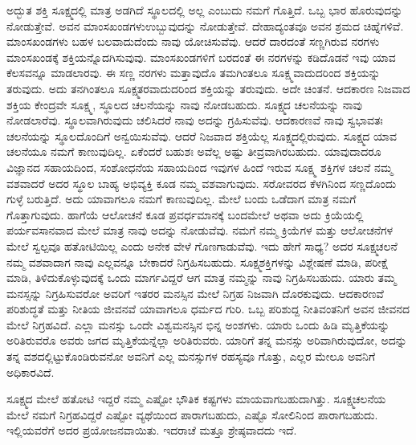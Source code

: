 ಅದ್ಭುತ ಶಕ್ತಿ ಸೂಕ್ಷ್ಮದಲ್ಲಿ ಮಾತ್ರ ಅಡಗಿದೆ ಸ್ಥೂಲದಲ್ಲಿ ಅಲ್ಲ ಎಂಬುದು ನಮಗೆ ಗೊತ್ತಿದೆ. ಒಬ್ಬ ಭಾರ ಹೊರುವುದನ್ನು ನೋಡುತ್ತೇವೆ. ಅವನ ಮಾಂಸಖಂಡಗಳು\break ಉಬ್ಬುವುದನ್ನು ನೋಡುತ್ತೇವೆ. ದೇಹಾದ್ಯಂತವೂ ಅವನ ಶ್ರಮದ ಚಿಹ್ನೆಗಳಿವೆ. ಮಾಂಸಖಂಡಗಳು ಬಹಳ ಬಲವಾದುದೆಂದು ನಾವು ಯೋಚಿಸುವೆವು. ಆದರೆ ದಾರದಂತೆ ಸಣ್ಣಗಿರುವ ನರಗಳು ಮಾಂಸಖಂಡಕ್ಕೆ ಶಕ್ತಿಯನ್ನೊದಗಿಸುವುವು. ಮಾಂಸಖಂಡಗಳಿಗೆ ಬರದಂತೆ ಈ ನರಗಳನ್ನು ಕಡಿದೊಡನೆ ಇವು ಯಾವ ಕೆಲಸವನ್ನೂ ಮಾಡಲಾರವು. ಈ ಸಣ್ಣ ನರಗಳು ಮತ್ತಾವುದೊ ತಮಗಿಂತಲೂ ಸೂಕ್ಷ್ಮವಾದುದರಿಂದ ಶಕ್ತಿಯನ್ನು ತರುವುದು. ಅದು ತನಗಿಂತಲೂ ಸೂಕ್ಷ್ಮತರವಾದುದರಿಂದ ಶಕ್ತಿಯನ್ನು ತರುವುದು. ಅದೇ ಚಿಂತನೆ. ಆದಕಾರಣ ನಿಜವಾದ ಶಕ್ತಿಯ ಕೇಂದ್ರವೇ ಸೂಕ್ಷ್ಮ, ಸ್ಥೂಲದ ಚಲನೆಯನ್ನು ನಾವು ನೋಡಬಹುದು. ಸೂಕ್ಷ್ಮದ ಚಲನೆಯನ್ನು ನಾವು ನೋಡಲಾರೆವು. ಸ್ಥೂಲವಾಗಿರುವುದು ಚಲಿಸಿದರೆ ನಾವು ಅದನ್ನು ಗ್ರಹಿಸುವೆವು. ಆದಕಾರಣವೆ ನಾವು ಸ್ವಭಾವತಃ ಚಲನೆಯನ್ನು ಸ್ಥೂಲದೊಂದಿಗೆ ಅನ್ವಯಿಸುವೆವು. ಆದರೆ ನಿಜವಾದ ಶಕ್ತಿಯೆಲ್ಲ ಸೂಕ್ಷ್ಮದಲ್ಲಿರುವುದು. ಸೂಕ್ಷ್ಮದ ಯಾವ ಚಲನೆಯೂ ನಮಗೆ ಕಾಣುವುದಿಲ್ಲ. ಏಕೆಂದರೆ ಬಹುಶಃ ಅವೆಲ್ಲ ಅಷ್ಟು ತೀವ್ರವಾಗಿರಬಹುದು. ಯಾವುದಾದರೂ ವಿಜ್ಞಾನದ ಸಹಾಯದಿಂದ, ಸಂಶೋಧನೆಯ ಸಹಾಯದಿಂದ ಇವುಗಳ ಹಿಂದೆ ಇರುವ ಸೂಕ್ಷ್ಮ ಶಕ್ತಿಗಳ ಚಲನೆ ನಮ್ಮ ವಶವಾದರೆ ಅದರ ಸ್ಥೂಲ ಬಾಹ್ಯ ಅಭಿವ್ಯಕ್ತಿ ಕೂಡ ನಮ್ಮ ವಶವಾಗುವುದು. ಸರೋವರದ ಕೆಳಗಿನಿಂದ ಸಣ್ಣದೊಂದು ಗುಳ್ಳೆ ಬರುತ್ತಿದೆ. ಅದು ಯಾವಾಗಲೂ ನಮಗೆ ಕಾಣುವುದಿಲ್ಲ. ಮೇಲೆ ಬಂದು ಒಡೆದಾಗ ಮಾತ್ರ ನಮಗೆ ಗೊತ್ತಾಗುವುದು. ಹಾಗೆಯೆ ಆಲೋಚನೆ ಕೂಡ ಪ್ರವರ್ಧಮಾನಕ್ಕೆ ಬಂದಮೇಲೆ ಅಥವಾ ಅದು ಕ್ರಿಯೆಯಲ್ಲಿ ಪರ್ಯವಸಾನವಾದ ಮೇಲೆ ಮಾತ್ರ ನಾವು ಅದನ್ನು ನೋಡುವೆವು. ನಮಗೆ ನಮ್ಮ ಕ್ರಿಯೆಗಳ ಮತ್ತು ಆಲೋಚನೆಗಳ ಮೇಲೆ ಸ್ವಲ್ಪವೂ ಹತೋಟಿಯಿಲ್ಲ ಎಂದು ಅನೇಕ ವೇಳೆ ಗೊಣಗಾಡುವೆವು. ಇದು ಹೇಗೆ ಸಾಧ್ಯ? ಅದರ ಸೂಕ್ಷ್ಮಚಲನೆ ನಮ್ಮ ವಶವಾದಾಗ ನಾವು ಎಲ್ಲವನ್ನೂ ಬೇಕಾದರೆ ನಿಗ್ರಹಿಸಬಹುದು. ಸೂಕ್ಷ್ಮಶಕ್ತಿಗಳನ್ನು ವಿಶ್ಲೇಷಣೆ ಮಾಡಿ, ಪರೀಕ್ಷೆ ಮಾಡಿ, ತಿಳಿದುಕೊಳ್ಳುವುದಕ್ಕೆ ಒಂದು ಮಾರ್ಗವಿದ್ದರೆ ಆಗ ಮಾತ್ರ ನಮ್ಮನ್ನು ನಾವು ನಿಗ್ರಹಿಸಬಹುದು. ಯಾರು ತಮ್ಮ ಮನಸ್ಸನ್ನು ನಿಗ್ರಹಿಸುವರೋ ಅವರಿಗೆ ಇತರರ ಮನಸ್ಸಿನ ಮೇಲೆ ನಿಗ್ರಹ ನಿಜವಾಗಿ ದೊರಕುವುದು. ಆದಕಾರಣವೆ ಪರಿಶುದ್ಧತೆ ಮತ್ತು ನೀತಿಯ ಜೀವನವೆ ಯಾವಾಗಲೂ ಧರ್ಮದ ಗುರಿ. ಒಬ್ಬ ಪರಿಶುದ್ದ ನೀತಿವಂತನಿಗೆ ಅವನ ಜೀವನದ ಮೇಲೆ ನಿಗ್ರಹವಿದೆ. ಎಲ್ಲಾ ಮನಸ್ಸು ಒಂದೇ ವಿಶ್ವಮನಸ್ಸಿನ ಭಿನ್ನ ಅಂಶಗಳು. ಯಾರು ಒಂದು ಹಿಡಿ ಮೃತ್ತಿಕೆಯನ್ನು ಅರಿತಿರುವರೊ ಅವರು ಜಗದ ಮೃತ್ತಿಕೆಯನ್ನೆಲ್ಲಾ ಅರಿತಿರುವರು. ಯಾರಿಗೆ ತನ್ನ ಮನಸ್ಸು ಅರಿವಾಗಿರುವುದೋ, ಅದನ್ನು ತನ್ನ ವಶದಲ್ಲಿಟ್ಟುಕೊಂಡಿರುವನೋ ಅವನಿಗೆ ಎಲ್ಲ ಮನಸ್ಸುಗಳ ರಹಸ್ಯವೂ ಗೊತ್ತು, ಎಲ್ಲರ ಮೇಲೂ ಅವನಿಗೆ ಅಧಿಕಾರವಿದೆ.

\vskip 2pt

ಸೂಕ್ಷ್ಮದ ಮೇಲೆ ಹತೋಟಿ ಇದ್ದರೆ ನಮ್ಮ ಎಷ್ಟೋ ಭೌತಿಕ ಕಷ್ಟಗಳು ಮಾಯವಾಗಬಹುದಾಗಿತ್ತು. ಸೂಕ್ಷ್ಮಚಲನೆಯ ಮೇಲೆ ನಮಗೆ ನಿಗ್ರಹವಿದ್ದರೆ ಎಷ್ಟೋ ವ್ಯಥೆಯಿಂದ ಪಾರಾಗಬಹುದು, ಎಷ್ಟೊ ಸೋಲಿನಿಂದ ಪಾರಾಗಬಹುದು. ಇಲ್ಲಿಯವರೆಗೆ ಅದರ ಪ್ರಯೋಜನವಾಯಿತು. ಇದರಾಚೆ ಮತ್ತೂ ಶ್ರೇಷ್ಠವಾದದು ಇದೆ.

